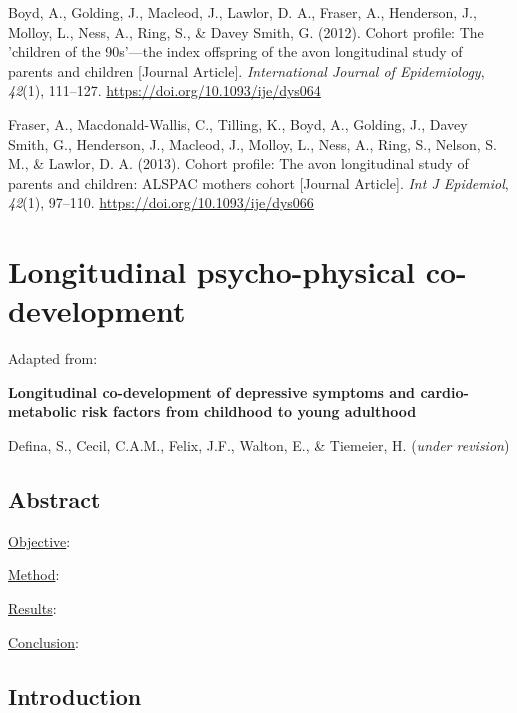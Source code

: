 \documentclass[
  letterpaper,
  DIV=11,
  numbers=noendperiod]{scrreport}
\newlength{\cslhangindent}
\newenvironment{CSLReferences}[2] %
 {\begin{list}{}{%
  \setlength{\itemindent}{0pt}
  \setlength{\leftmargin}{0pt}
  \setlength{\parsep}{0pt}
  \ifodd #1
   \setlength{\leftmargin}{\cslhangindent}
   \setlength{\itemindent}{-1\cslhangindent}
  \fi
  \setlength{\itemsep}{#2\baselineskip}}}
 {\end{list}}
\begin{document}
\label{refs--5}
\begin{CSLReferences}{1}{0}
Boyd, A., Golding, J., Macleod, J., Lawlor, D. A., Fraser, A.,
Henderson, J., Molloy, L., Ness, A., Ring, S., \& Davey Smith, G.
(2012). Cohort profile: The 'children of the 90s'---the index offspring
of the avon longitudinal study of parents and children {[}Journal
Article{]}. \emph{International Journal of Epidemiology}, \emph{42}(1),
111--127. \url{https://doi.org/10.1093/ije/dys064}

Fraser, A., Macdonald-Wallis, C., Tilling, K., Boyd, A., Golding, J.,
Davey Smith, G., Henderson, J., Macleod, J., Molloy, L., Ness, A., Ring,
S., Nelson, S. M., \& Lawlor, D. A. (2013). Cohort profile: The avon
longitudinal study of parents and children: ALSPAC mothers cohort
{[}Journal Article{]}. \emph{Int J Epidemiol}, \emph{42}(1), 97--110.
\url{https://doi.org/10.1093/ije/dys066}

\end{CSLReferences}

\chapter{Longitudinal psycho-physical
co-development}\label{sec-chapter6}

Adapted from:

\textbf{Longitudinal co-development of depressive symptoms and
cardio-metabolic risk factors from childhood to young adulthood}

Defina, S., Cecil, C.A.M., Felix, J.F., Walton, E., \& Tiemeier, H.
(\emph{under revision})

\section*{Abstract}\label{abstract-4}


\ul{Objective}:

\ul{Method}:

\ul{Results}:

\ul{Conclusion}:

\newpage

\section{Introduction}\label{introduction-4}
\end{document}
